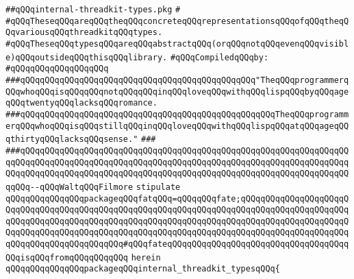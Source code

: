 \label{src/lib/src/lib/thread-kit/src/core-thread-kit/internal-threadkit-types.pkg}
\verb|##qQQqinternal-threadkit-types.pkg|\newline
\verb|#|\newline
\verb|#qQQqTheseqQQqareqQQqtheqQQqconcreteqQQqrepresentationsqQQqofqQQqtheqQQqvariousqQQqthreadkitqQQqtypes.|\newline
\verb|#qQQqTheseqQQqtypesqQQqareqQQqabstractqQQq(orqQQqnotqQQqevenqQQqvisible)qQQqoutsideqQQqthisqQQqlibrary.|\newline
\newline
\verb|#qQQqCompiledqQQqby:|\newline
\verb|#qQQqqQQqqQQqqQQqqQQq|\newline
\newline
\newline
\verb|###qQQqqQQqqQQqqQQqqQQqqQQqqQQqqQQqqQQqqQQqqQQqqQQq"TheqQQqprogrammerqQQqwhoqQQqisqQQqqQQqnotqQQqqQQqinqQQqloveqQQqwithqQQqlispqQQqbyqQQqageqQQqtwentyqQQqlacksqQQqromance.|\newline
\verb|###qQQqqQQqqQQqqQQqqQQqqQQqqQQqqQQqqQQqqQQqqQQqqQQqqQQqTheqQQqprogrammerqQQqwhoqQQqisqQQqstillqQQqinqQQqloveqQQqwithqQQqlispqQQqatqQQqageqQQqthirtyqQQqlacksqQQqsense."|\newline
\verb|###|\newline
\verb|###qQQqqQQqqQQqqQQqqQQqqQQqqQQqqQQqqQQqqQQqqQQqqQQqqQQqqQQqqQQqqQQqqQQqqQQqqQQqqQQqqQQqqQQqqQQqqQQqqQQqqQQqqQQqqQQqqQQqqQQqqQQqqQQqqQQqqQQqqQQqqQQqqQQqqQQqqQQqqQQqqQQqqQQqqQQqqQQqqQQqqQQqqQQqqQQqqQQqqQQqqQQqqQQqqQQq--qQQqWaltqQQqFilmore|\newline
\newline
\newline
\verb|stipulate|\newline
\verb|qQQqqQQqqQQqqQQqpackageqQQqfatqQQq=qQQqqQQqfate;qQQqqQQqqQQqqQQqqQQqqQQqqQQqqQQqqQQqqQQqqQQqqQQqqQQqqQQqqQQqqQQqqQQqqQQqqQQqqQQqqQQqqQQqqQQqqQQqqQQqqQQqqQQqqQQqqQQqqQQqqQQqqQQqqQQqqQQqqQQqqQQqqQQqqQQqqQQqqQQqqQQqqQQqqQQqqQQqqQQqqQQqqQQqqQQqqQQqqQQqqQQqqQQqqQQqqQQqqQQqqQQqqQQqqQQqqQQqqQQqqQQqqQQqqQQqqQQq#qQQqfateqQQqqQQqqQQqqQQqqQQqqQQqqQQqqQQqqQQqqQQqisqQQqfromqQQqqQQqqQQq|\newline
\verb|herein|\newline
\newline
\verb|qQQqqQQqqQQqqQQqpackageqQQqinternal_threadkit_typesqQQq{|\newline
